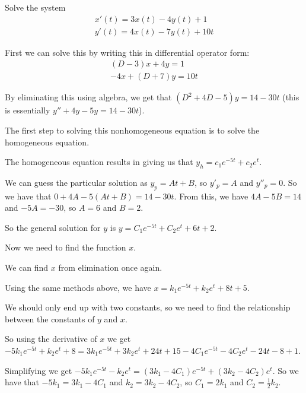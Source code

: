\documentclass[../diffeq.tex]{subfiles}
\begin{document}
\begin{example}
    Solve the system 
    \begin{align*}
        x'(t)=3x(t)-4y(t)+1 \\
        y'(t) = 4x(t)-7y(t)+10t
    \end{align*}

    First we can solve this by writing this in differential operator form:
    \begin{align*}
        (D-3)x+4y = 1\\
        -4x + (D+7)y = 10t 
    \end{align*}

    By eliminating this using algebra, we get that $(D^2+4D-5)y=14-30t$ (this is essentially $y''+4y-5y=14-30t$).

    The first step to solving this nonhomogeneous equation is to solve the homogeneous equation.

    The homogeneous equation results in giving us that $y_h = c_1e^{-5t}+c_2e^t$. 

    We can guess the particular solution as $y_p=At+B$, so $y'_p =A$ and $y''_p=0$. So we have that $0+4A-5(At+B)=14-30t$. From this, we have $4A-5B=14$ and $-5A=-30$, so $A=6$ and $B=2$.

    So the general solution for $y$ is $y=C_1e^{-5t}+C_2e^t+6t+2$.

    Now we need to find the function $x$.

    We can find $x$ from elimination once again.

    Using the same methods above, we have $x=k_1e^{-5t}+k_2e^t+8t+5$. 

    We should only end up with two constants, so we need to find the relationship between the constants of $y$ and $x$.

    So using the derivative of $x$ we get $-5k_1e^{-5t}+k_2e^t+8=3k_1e^{-5t}+3k_2e^t+24t+15-4C_1e^{-5t}-4C_2e^t-24t-8+1$.

    Simplifying we get $-5k_1e^{-5t}-k_2e^t = (3k_1-4C_1)e^{-5t}+(3k_2-4C_2)e^t$. So we have that $-5k_1=3k_1-4C_1$ and $k_2=3k_2-4C_2$, so $C_1=2k_1$ and $C_2=\frac{1}{2}k_2$.

    
\end{example}
\end{document}
